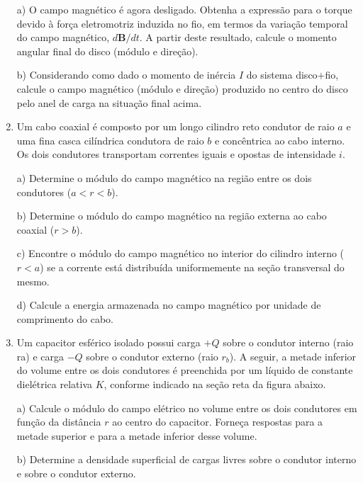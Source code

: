 \begin{enumerate}[start=1,label={\bfseries Q\arabic*.}]
a) O campo magnético é agora desligado. Obtenha a expressão para o torque devido à força eletromotriz induzida no fio, em termos da variação temporal do campo magnético, $d\mathbf{B}/dt$. A partir deste resultado, calcule o momento angular final do disco (módulo e direção).

\resposta

b) Considerando como dado o momento de inércia $I$ do sistema disco$+$fio, calcule o campo magnético (módulo e direção) produzido no centro do disco pelo anel de carga na situação final acima.

\resposta


\item Um cabo coaxial é composto por um longo cilindro reto condutor de raio $a$ e uma fina casca cilíndrica condutora de raio $b$ e concêntrica ao cabo interno. Os dois condutores transportam correntes iguais e opostas de intensidade $i$.


a) Determine o módulo do campo magnético na região entre os dois condutores ($a < r < b$).

\resposta

b) Determine o módulo do campo magnético na região externa ao cabo coaxial ($r > b$).

\resposta

c) Encontre o módulo do campo magnético no interior do cilindro interno ($r < a$) se a corrente está distribuída uniformemente na seção transversal do mesmo.

\resposta

d) Calcule a energia armazenada no campo magnético por unidade de comprimento do cabo.

\resposta


\item Um capacitor esférico isolado possui carga $+Q$ sobre o condutor interno (raio ra) e carga $-Q$ sobre o condutor externo (raio $r_{b}$). A seguir, a metade inferior do volume entre os dois condutores é preenchida por um líquido de constante dielétrica relativa $K$, conforme indicado na seção reta da figura abaixo.

a) Calcule o módulo do campo elétrico no volume entre os dois condutores em função da distância $r$ ao centro do capacitor. Forneça respostas para a metade superior e para a metade inferior desse volume.

\resposta

b) Determine a densidade superficial de cargas livres sobre o condutor interno e sobre o condutor externo.


\end{enumerate}
